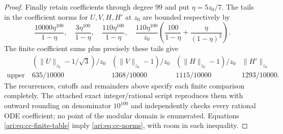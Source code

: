 \begin{proof}
Finally retain coefficients through degree 99 and put
$\eta=5z_0/7$. The tails in the coefficient norms for
$U,V,H,H'$ at $z_0$ are bounded respectively by
\begin{equation}\label{ari:eq:cc-tail100}
 \frac{10000\eta^{100}}{1-\eta},\quad
 \frac{3\eta^{100}}{1-\eta},\quad
 \frac{110\eta^{100}}{1-\eta},\quad
 \frac{110\eta^{100}}{z_0}
 \left(\frac{100}{1-\eta}+\frac{\eta}{(1-\eta)^2}\right).
\end{equation}
The finite coefficient sums plus precisely these tails give
\begin{equation}\label{ari:eq:cc-finite-table}
 \begin{array}{c|cccc}
 & (\|U\|_{z_0}-1/\sqrt3)/z_0
 & (\|V\|_{z_0}-1)/z_0
 & (\|H\|_{z_0}-1)/z_0 & \|H'\|_{z_0}\\ \hline
 \text{upper bound}&635/10000&1368/10000&1115/10000&1293/10000.
 \end{array}
\end{equation}
The recurrences, cutoffs and remainders above specify each finite
comparison completely. The attached exact integer/rational
script reproduces them with outward rounding on denominator
$10^{100}$ and independently checks every rational ODE
coefficient; no point of the modular domain is enumerated.
Equations \eqref{ari:eq:cc-finite-table} imply
\eqref{ari:eq:cc-norms}, with room in each inequality.


\end{proof}
